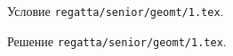 Условие \texttt{regatta/senior/geomt/1.tex}.

\solution Решение \texttt{regatta/senior/geomt/1.tex}.
